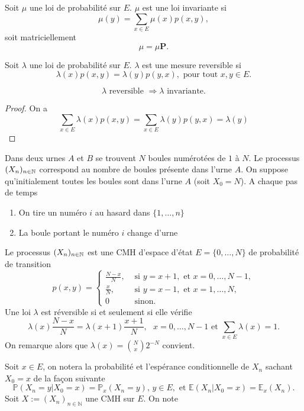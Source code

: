 \begin{definition}
Soit $\mu$ une loi de probabilité sur $E$. $\mu$ est une loi invariante si 
$$
\mu(y) = \sum_{x\in E}\mu(x)p(x,y),
$$
soit matriciellement $$\mu = \mu \mathbf{P}.$$
\end{definition}
\begin{definition}
Soit $\lambda$ une loi de probabilité sur $E$. $\lambda$ est une mesure reversible si
$$
\lambda(x)p(x,y) = \lambda(y)p(y,x),\text{ pour tout }x,y\in E.
$$
\end{definition}
\begin{prop}
$$
\lambda \text{ reversible }\Rightarrow  \lambda \text{ invariante.}
$$
\end{prop}
\begin{proof}
On a
$$
\sum_{x\in E}\lambda(x)p(x,y)=\sum_{x\in E}\lambda(y)p(y,x) =\lambda(y)
$$
\end{proof}
\begin{ex}
Dans deux urnes $A$ et $B$ se trouvent $N$ boules numérotées de $1$ à $N$. Le processus $(X_n)_{n\in \mathbb{N}}$ correspond au nombre de boules présente dans l'urne $A$. On suppose qu'initialement toutes les boules sont dans l'urne $A$ (soit $X_0 = N$). A chaque pas de temps
\begin{enumerate}
    \item On tire un numéro $i$ au hasard dans $\{1,\ldots, n\}$
    \item La boule portant le numéro $i$ change d'urne
\end{enumerate}
Le processus $(X_n)_{n\in \mathbb{N}}$ est une CMH d'espace d'état $E = \{0,\ldots, N\}$ de probabilité de transition
$$
p(x,y) = \begin{cases}
\frac{N-x}{N},&\text{ si }y = x+1,\text{ et }x = 0,\ldots, N-1, \\
\frac{x}{N},&\text{ si }y = x-1,\text{ et }x = 1,\ldots, N,\\
0&\text{ sinon}.
\end{cases}
$$
Une loi $\lambda$ est réversible si et seulement si elle vérifie
$$
\lambda(x)\frac{N-x}{N} = \lambda(x+1)\frac{x+1}{N},\text{ }x= 0,\ldots, N-1\text{ et }\sum_{x\in E}\lambda(x) = 1.
$$
On remarque alors que $\lambda(x) = \binom{N}{x}2^{-N}$ convient.
\end{ex}
Soit $x\in E$, on notera la probabilité et l'espérance conditionnelle de $X_n$ sachant $X_0=x$ de la façon suivante
$$
\mathbb{P}(X_n=y|X_0=x)=\mathbb{P}_{x}(X_n=y)\text{, }y\in E,\text{ et }\mathbb{E}(X_n|X_0=x)=\mathbb{E}_{x}(X_n).
$$
Soit $X:=(X_n)_{n\in\mathbb{N}}$ une CMH sur $E$. On note

